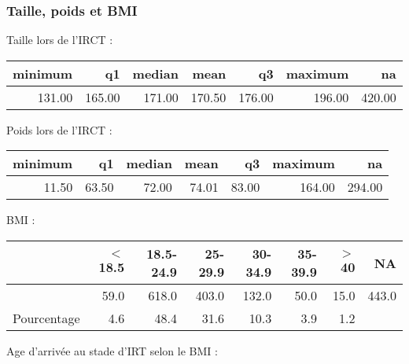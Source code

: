 \documentclass[11pt,a4paper]{article}\usepackage[]{graphicx}\usepackage[]{color}
\begin{document}
    \subsubsection{Taille, poids et BMI}
  
Taille lors de l'IRCT :
  
\begin{table}[ht]
\centering
\begin{tabular}{rrrrrrr}
  \hline
minimum & q1 & median & mean & q3 & maximum & na \\ 
  \hline
131.00 & 165.00 & 171.00 & 170.50 & 176.00 & 196.00 & 420.00 \\ 
   \hline
\end{tabular}
\end{table}


Poids lors de l'IRCT :

\begin{table}[ht]
\centering
\begin{tabular}{rrrrrrr}
  \hline
minimum & q1 & median & mean & q3 & maximum & na \\ 
  \hline
11.50 & 63.50 & 72.00 & 74.01 & 83.00 & 164.00 & 294.00 \\ 
   \hline
\end{tabular}
\end{table}


BMI :

\begin{table}[H]
\centering
\begin{tabular}{rrrrrrrr}
  \hline
 & $<$18.5 & 18.5-24.9 & 25-29.9 & 30-34.9 & 35-39.9 & $>$40 & NA \\ 
  \hline
 & 59.0 & 618.0 & 403.0 & 132.0 & 50.0 & 15.0 & 443.0 \\ 
  Pourcentage & 4.6 & 48.4 & 31.6 & 10.3 & 3.9 & 1.2 &  \\ 
   \hline
\end{tabular}
\end{table}


Age d'arrivée au stade d'IRT selon le BMI :
\end{document}
